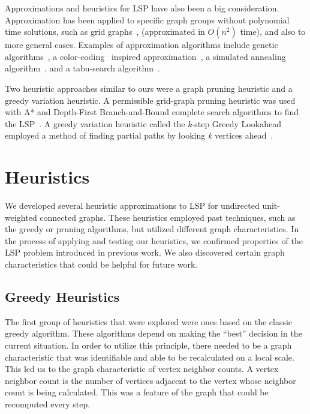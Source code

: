 \documentclass[twocolumn,showpacs,%
  nofootinbib,aps,superscriptaddress,%
  eqsecnum,prd,notitlepage,showkeys,11pt]{article}
\begin{document}
Approximations and heuristics for LSP have also been a big consideration. Approximation has been applied to specific graph groups without polynomial time solutions, such as grid graphs~\cite{zhang2011approximating}, (approximated in $O({n^2})$ time), and also to more general cases. Examples of approximation algorithms include genetic algorithms~\cite{mathew2012genetic, portugal2010study, scholvin1999approximating}, a color-coding~\cite{alon1995color} inspired approximation~\cite{scutella2003approximation}, a simulated annealing algorithm~\cite{scholvin1999approximating}, and a tabu-search algorithm~\cite{scholvin1999approximating}.

Two heuristic approaches similar to ours were a graph pruning heuristic and a greedy variation heuristic. A permissible grid-graph pruning heuristic was used with A* and Depth-First Branch-and-Bound complete search algorithms to find the LSP~\cite{cohen2020solving}. A greedy variation heuristic called the \textit{k}-step Greedy Lookahead employed a method of finding partial paths by looking \textit{k} vertices ahead~\cite{scholvin1999approximating}.

\section{Heuristics}

We developed several heuristic approximations to LSP for undirected unit-weighted connected graphs. These heuristics employed past techniques, such as the greedy or pruning algorithms, but utilized different graph characteristics. In the process of applying and testing our heuristics, we confirmed properties of the LSP problem introduced in previous work. We also discovered certain graph characteristics that could be helpful for future work.

\subsection{Greedy Heuristics}

The first group of heuristics that were explored were ones based on the classic greedy algorithm. These algorithms depend on making the ``best'' decision in the current situation. In order to utilize this principle, there needed to be a graph characteristic that was identifiable and able to be recalculated on a local scale. This led us to the graph characteristic of vertex neighbor counts. A vertex neighbor count is the number of vertices adjacent to the vertex whose neighbor count is being calculated. This was a feature of the graph that could be recomputed every step.
\end{document}
